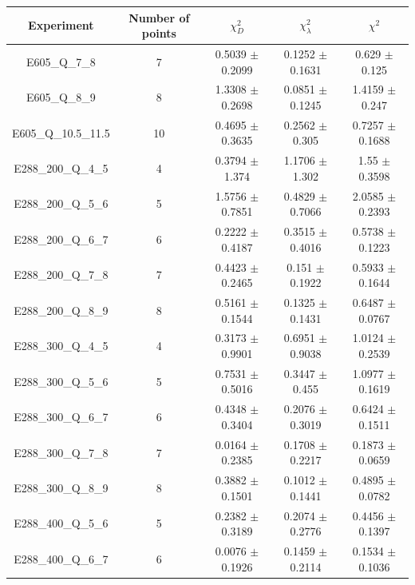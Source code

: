 \documentclass[
]{article}
\begin{document}
\begin{table}[h]

\centering

\begin{tabular}{|c|c|c|c|c|} \hline

\textbf{Experiment} & \textbf{Number of
points} & \textbf{\(\chi_{D}^2\)} & \textbf{\(\chi_{\lambda}^2\)} & \textbf{\(\chi^2\)} \\ \hline

E605\_Q\_7\_8 & 7 & 0.5039 \(\pm\) 0.2099 & 0.1252 \(\pm\)
0.1631 & 0.629 \(\pm\) 0.125 \\ \hline
E605\_Q\_8\_9 & 8 & 1.3308 \(\pm\) 0.2698 & 0.0851 \(\pm\)
0.1245 & 1.4159 \(\pm\) 0.247 \\ \hline
E605\_Q\_10.5\_11.5 & 10 & 0.4695 \(\pm\) 0.3635 & 0.2562 \(\pm\)
0.305 & 0.7257 \(\pm\) 0.1688 \\ \hline
E288\_200\_Q\_4\_5 & 4 & 0.3794 \(\pm\) 1.374 & 1.1706 \(\pm\)
1.302 & 1.55 \(\pm\) 0.3598 \\ \hline
E288\_200\_Q\_5\_6 & 5 & 1.5756 \(\pm\) 0.7851 & 0.4829 \(\pm\)
0.7066 & 2.0585 \(\pm\) 0.2393 \\ \hline
E288\_200\_Q\_6\_7 & 6 & 0.2222 \(\pm\) 0.4187 & 0.3515 \(\pm\)
0.4016 & 0.5738 \(\pm\) 0.1223 \\ \hline
E288\_200\_Q\_7\_8 & 7 & 0.4423 \(\pm\) 0.2465 & 0.151 \(\pm\)
0.1922 & 0.5933 \(\pm\) 0.1644 \\ \hline
E288\_200\_Q\_8\_9 & 8 & 0.5161 \(\pm\) 0.1544 & 0.1325 \(\pm\)
0.1431 & 0.6487 \(\pm\) 0.0767 \\ \hline
E288\_300\_Q\_4\_5 & 4 & 0.3173 \(\pm\) 0.9901 & 0.6951 \(\pm\)
0.9038 & 1.0124 \(\pm\) 0.2539 \\ \hline
E288\_300\_Q\_5\_6 & 5 & 0.7531 \(\pm\) 0.5016 & 0.3447 \(\pm\)
0.455 & 1.0977 \(\pm\) 0.1619 \\ \hline
E288\_300\_Q\_6\_7 & 6 & 0.4348 \(\pm\) 0.3404 & 0.2076 \(\pm\)
0.3019 & 0.6424 \(\pm\) 0.1511 \\ \hline
E288\_300\_Q\_7\_8 & 7 & 0.0164 \(\pm\) 0.2385 & 0.1708 \(\pm\)
0.2217 & 0.1873 \(\pm\) 0.0659 \\ \hline
E288\_300\_Q\_8\_9 & 8 & 0.3882 \(\pm\) 0.1501 & 0.1012 \(\pm\)
0.1441 & 0.4895 \(\pm\) 0.0782 \\ \hline
E288\_400\_Q\_5\_6 & 5 & 0.2382 \(\pm\) 0.3189 & 0.2074 \(\pm\)
0.2776 & 0.4456 \(\pm\) 0.1397 \\ \hline
E288\_400\_Q\_6\_7 & 6 & 0.0076 \(\pm\) 0.1926 & 0.1459 \(\pm\)
0.2114 & 0.1534 \(\pm\) 0.1036 \\ \hline

\end{tabular}
\end{table}
\end{document}
